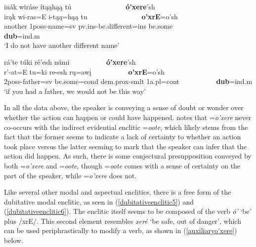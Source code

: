 \begin{exe}
\begin{xlist}
	\item\label{dubitativeenclitic5}
	\glll inák wiráse ítąąhąą tú ~ ~ ~ ~ ~ ~ ~ ~ ~  \textbf{ó'xere}'sh\\
	irąk wi-ras=E i-tąą=hąą tu ~ ~ ~ ~ ~ ~ ~ ~ ~  \textbf{o'xrE}=o'sh\\
	\textnormal{another} 1poss-\textnormal{name}=sv pv.ins-\textnormal{be.different}=ins \textnormal{be.some} ~ ~ ~ ~ ~ ~ ~ ~ ~ \textbf{dub}=ind.m\\
	\glt `I do not have another different name' \citep[14]{hollow1973a}
	
	\item\label{dubitativeenclitic6}
	\glll rá'te túki ré'esh númi ~ ~ ~ ~ ~ ~  \textbf{ó'xere}'sh\\
	r'-at=E tu=ki re-esh rų=awį ~ ~ ~ ~ ~ ~  \textbf{o'xrE}=o'sh\\
	2poss-\textnormal{father}=sv \textnormal{be.some}=cond dem.prox-smlt 1a.pl=cont ~ ~ ~ ~ ~ ~ \textbf{dub}=ind.m\\
	\glt `if you had a father, we would not be this way' \citep[114]{hollow1973a}	

	\end{xlist}

\end{exe}

In all the data above, the speaker is conveying a sense of doubt or wonder over whether the action can happen or could have happened. \citet[460]{hollow1970} notes that =\textit{o'xere} never co-occurs with the indirect evidential enclitic =\textit{oote}, which likely stems from the fact that the former seems to indicate a lack of certainty to whether an action took place versus the latter seeming to mark that the speaker can infer that the action did happen. As such, there is some conjectural presupposition conveyed by both =\textit{o'xere} and =\textit{oote}, though =\textit{oote} comes with a sense of certainty on the part of the speaker, while =\textit{o'xere} does not.

Like several other modal and aspectual enclitics, there is a free form of the dubitative modal enclitic, as seen in (\ref{dubitativeenclitic5}) and (\ref{dubitativeenclitic6}). The enclitic itself seems to be composed of the verb \textit{ó'} `be' plus /xrE/. This second element resembles \textit{xeré} `be safe, out of danger', which can be used periphrastically to modify a verb, as shown in (\ref{auxiliaryo'xere}) below.

